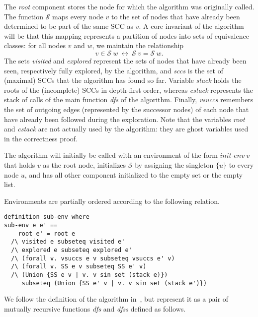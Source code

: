 \documentclass[sigplan,10pt,anonymous,review]{acmart}
\newcommand{\prog}[1]{\textit{#1}}
\renewcommand{\SS}{\mathcal{S}}
\begin{document}
The \prog{root} component stores the node for which the algorithm was originally called.
The function $\SS$ maps every node $v$ to the set of nodes that have already been determined to be part of the same SCC as $v$. A core invariant of the algorithm will be that this mapping represents a partition of nodes into sets of equivalence classes: for all nodes $v$ and $w$, we maintain the relationship
\[
  v \in \SS~w\ \longleftrightarrow\ \SS~v = \SS~w.
\]
The sets \prog{visited} and \prog{explored} represent the sets of nodes that have already been seen, respectively fully explored, by the algorithm, and \prog{sccs} is the set of (maximal) SCCs that the algorithm has found so far. Variable \prog{stack} holds the roots of the (incomplete) SCCs in depth-first order, whereas \prog{cstack} represents the stack of calls of the main function \prog{dfs} of the algorithm. Finally, \prog{vsuccs} remembers the set of outgoing edges (represented by the successor nodes) of each node that have already been followed during the exploration. Note that the variables \prog{root} and \prog{cstack} are not actually used by the algorithm: they are ghost variables used in the correctness proof.

The algorithm will initially be called with an environment of the form $\prog{init-env}~v$ that holds $v$ as the root node, initializes $\SS$ by assigning the singleton $\{u\}$ to every node $u$, and has all other component initialized to the empty set or the empty list.

Environments are partially ordered according to the following relation.

\begin{small}
\begin{lstlisting}[language=isabelle]
definition sub-env where
sub-env e e' ==
    root e' = root e
  /\ visited e subseteq visited e'
  /\ explored e subseteq explored e'
  /\ (forall v. vsuccs e v subseteq vsuccs e' v)
  /\ (forall v. SS e v subseteq SS e' v)
  /\ (Union {SS e v | v. v sin set (stack e)})
     subseteq (Union {SS e' v | v. v sin set (stack e')})
\end{lstlisting}
\end{small}

We follow the definition of the algorithm in~\cite{bloemen:strong}, but represent it as a pair of mutually recursive functions \prog{dfs} and \prog{dfss} defined as follows.
\end{document}
